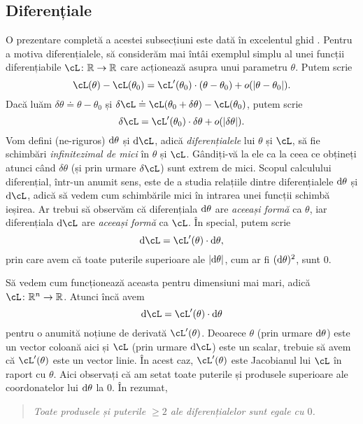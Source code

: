 \documentclass[../../book-main_ro.tex]{subfiles}
\begin{document}
\subsection{Diferențiale}

O prezentare completă a acestei subsecțiuni este dată în excelentul ghid \cite{bright2025matrix}.
Pentru a motiva diferențialele, să considerăm mai întâi exemplul simplu al unei funcții diferențiabile \(\cL \colon \R \to \R\) care acționează asupra unui parametru \(\theta\). Putem scrie
\begin{equation}
    \cL(\theta) - \cL(\theta_{0}) = \cL^{\prime}(\theta_{0})\cdot(\theta - \theta_{0}) + o(\abs{\theta - \theta_{0}}).
\end{equation}
Dacă luăm \(\delta\theta \doteq \theta - \theta_{0}\) și \(\delta\cL \doteq \cL(\theta_{0} + \delta\theta) - \cL(\theta_{0})\), putem scrie
\begin{equation}
    \delta\cL = \cL^{\prime}(\theta_{0})\cdot\delta\theta + o(\abs{\delta\theta}).
\end{equation}
Vom defini (ne-riguros) \(\mathrm{d}\theta\) și \(\odif{\cL}\), adică \textit{diferențialele} lui \(\theta\) și \(\cL\), să fie schimbări \textit{infinitezimal de mici} în \(\theta\) și \(\cL\).
Gândiți-vă la ele ca la ceea ce obțineți atunci când \(\delta\theta\) (și prin urmare \(\delta \cL\)) sunt extrem de mici. Scopul calculului diferențial, într-un anumit sens, este de a studia relațiile dintre diferențialele \(\mathrm{d}\theta\) și \(\odif{\cL}\), adică să vedem cum schimbările mici în intrarea unei funcții schimbă ieșirea. Ar trebui să observăm că diferențiala \(\mathrm{d}\theta\) are \textit{aceeași formă} ca \(\theta\), iar diferențiala \(\odif{\cL}\) are \textit{aceeași formă} ca \(\cL\). În special, putem scrie
\begin{equation}
    \odif{\cL} = \cL^{\prime}(\theta)\cdot\odif{\theta},
\end{equation}
prin care avem că toate puterile superioare ale \(\abs{\odif{\theta}}\), cum ar fi \((\mathrm{d}\theta)^{2}\), sunt \(0\).

Să vedem cum funcționează aceasta pentru dimensiuni mai mari, adică \(\cL \colon \R^{n} \to \R\). Atunci încă avem
\begin{equation}
    \odif{\cL} = \cL^{\prime}(\theta)\cdot\odif{\theta}
\end{equation}
pentru o anumită noțiune de derivată \(\cL^{\prime}(\theta)\). Deoarece \(\theta\) (prin urmare \(\mathrm{d}\theta\)) este un vector coloană aici și \(\cL\) (prin urmare \(\odif{\cL}\)) este un scalar, trebuie să avem că \(\cL^{\prime}(\theta)\) este un vector linie. În acest caz, \(\cL^{\prime}(\theta)\) este Jacobianul lui \(\cL\) în raport cu \(\theta\). Aici observați că am setat toate puterile și produsele superioare ale coordonatelor lui \(\mathrm{d}\theta\) la \(0\). În rezumat,
\begin{quote}
    \centering
    \textit{Toate produsele și puterile \(\geq 2\) ale diferențialelor sunt egale cu \(0\).}
\end{quote}
\end{document}
